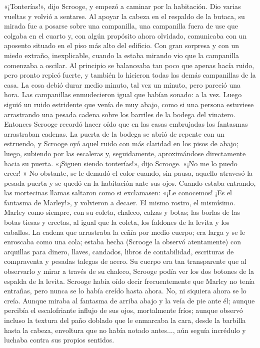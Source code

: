 \documentclass{novela}
\begin{document}
 «¡Tonterías!», dijo Scrooge, y empezó a caminar por la habitación. Dio varias vueltas y volvió a sentarse. Al apoyar la cabeza en el respaldo de la butaca, su mirada fue a posarse sobre una campanilla, una campanilla fuera de use que colgaba en el cuarto y, con algún propósito ahora olvidado, comunicaba con un aposento situado en el piso más alto del edificio. Con gran sorpresa y con un miedo extraño, inexplicable, cuando la estaba mirando vio que la campanilla comenzaba a oscilar. Al principio se balanceaba tan poco que apenas hacía ruido, pero pronto repicó fuerte, y también lo hicieron todas las demás campanillas de la casa.
 La cosa debió durar medio minuto, tal vez un minuto, pero pareció una hora. Las campanillas enmudecieron igual que habían sonado: a la vez. Luego siguió un ruido estridente que venía de muy abajo, como si una persona estuviese arrastrando una pesada cadena sobre los barriles de la bodega del vinatero. Entonces Scrooge recordó hacer oído que en las casas embrujadas los fantasmas arrastraban cadenas.
 La puerta de la bodega se abrió de repente con un estruendo, y Scrooge oyó aquel ruido con más claridad en los pisos de abajo; luego, subiendo por las escaleras y, seguidamente, aproximándose directamente hacia su puerta.
 «¡Siguen siendo tonterías!», dijo Scrooge. «¡No me lo puedo creer! »
 No obstante, se le demudó el color cuando, sin pausa, aquello atravesó la pesada puerta y se quedó en la habitación ante sus ojos. Cuando estaba entrando, las mortecinas llamas saltaron como si exclamasen: «¡Le conocemos! ¡Es el fantasma de Marley!», y volvieron a decaer.
 El mismo rostro, el mismísimo. Marley como siempre, con su coleta, chaleco, calzas y botas; las borlas de las botas tiesas y erectas, al igual que la coleta, los faldones de la levita y los caballos. La cadena que arrastraba la ceñía por medio cuerpo; era larga y se le enroscaba como una cola; estaba hecha (Scrooge la observó atentamente) con arquillas para dinero, llaves, candados, libros de contabilidad, escrituras de compraventa y pesadas talegas de acero. Su cuerpo era tan transparente que al observarlo y mirar a través de su chaleco, Scrooge podía ver los dos botones de la espalda de la levita.
 Scrooge había oído decir frecuentemente que Marlcy no tenía entrañas, pero nunca se lo había creído hasta ahora.
 No, ni siquiera ahora se lo creía. Aunque miraba al fantasma de arriba abajo y la veía de pie ante él; aunque percibía el escalofriante influjo de sus ojos, mortalmente fríos; aunque observó incluso la textura del paño doblado que le enmarcaba la cara, desde la barbilla hasta la cabeza, envoltura que no había notado antes..., aún seguía incrédulo y luchaba contra sus propios sentidos.
\end{document}
